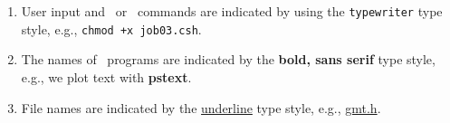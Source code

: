 \begin{enumerate}

\item User input and \GMT\ or \UNIX\ commands are indicated by
using the \texttt{typewriter} type style, e.g.,
\texttt{chmod +x job03.csh}.

\item The names of \GMT\ programs are indicated by the
\textsf{\textbf{bold, sans serif}} type style, e.g.,
we plot text with \textsf{\textbf{pstext}}.


\item File names are indicated by the \underline{underline}
type style, e.g., \underline{gmt.h}.

\end{enumerate}
